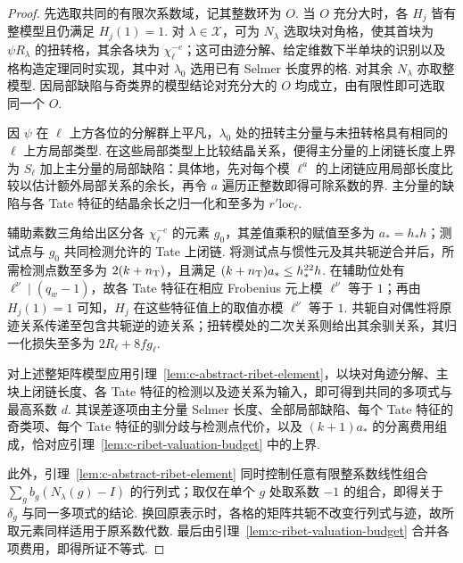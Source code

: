\begin{proof}
先选取共同的有限次系数域，记其整数环为 $O$.
当 $O$ 充分大时，各 $H_j$ 皆有整模型且仍满足 $H_j(1)=1$.
对 $\lambda\in\mathcal X$，可为 $N_\lambda$ 选取块对角格，使其首块为 $\psi R_\lambda$ 的扭转格，其余各块为 $\chi_\ell^{-e}$；这可由迹分解、给定维数下半单块的识别以及格构造定理同时实现，其中对 $\lambda_0$ 选用已有 Selmer 长度界的格.
对其余 $N_\lambda$ 亦取整模型. 因局部缺陷与奇类界的模型结论对充分大的 $O$ 均成立，由有限性即可选取同一个 $O$.

因 $\psi$ 在 $\ell$ 上方各位的分解群上平凡，$\lambda_0$ 处的扭转主分量与未扭转格具有相同的 $\ell$ 上方局部类型.
在这些局部类型上比较结晶关系，便得主分量的上闭链长度上界为 $S_\ell$ 加上主分量的局部缺陷：具体地，先对每个模 $\ell^a$ 的上闭链应用局部长度比较以估计额外局部关系的余长，再令 $a$ 遍历正整数即得可除系数的界.
主分量的缺陷与各 Tate 特征的结晶余长之归一化和至多为 $r'\mathrm{loc}_\ell$.

辅助素数三角给出区分各 $\chi_\ell^{-e}$ 的元素 $g_0$，其差值乘积的赋值至多为 $a_*=h_*h$；测试点与 $g_0$ 共同检测允许的 Tate 上闭链.
将测试点与惯性元及其共轭逆合并后，所需检测点数至多为 $2(k+n_{\rm T})$，且满足 $(k+n_{\rm T})a_*\le h_*^{22}h$.
在辅助位处有 $\ell^\nu\mid(q_w-1)$，故各 Tate 特征在相应 Frobenius 元上模 $\ell^\nu$ 等于 $1$；再由 $H_j(1)=1$ 可知，$H_j$ 在这些特征值上的取值亦模 $\ell^\nu$ 等于 $1$.
共轭自对偶性将原迹关系传递至包含共轭逆的迹关系；扭转模处的二次关系则给出其余驯关系，其归一化损失至多为 $2R_\ell+8f g_\ell$.

对上述整矩阵模型应用引理~\ref{lem:c-abstract-ribet-element}，以块对角迹分解、主块上闭链长度、各 Tate 特征的检测以及迹关系为输入，即可得到共同的多项式与最高系数 $d$.
其误差逐项由主分量 Selmer 长度、全部局部缺陷、每个 Tate 特征的奇类项、每个 Tate 特征的驯分歧与检测点代价，以及 $(k+1)a_*$ 的分离费用组成，恰对应引理~\ref{lem:c-ribet-valuation-budget} 中的上界.

此外，引理~\ref{lem:c-abstract-ribet-element} 同时控制任意有限整系数线性组合 $\sum_g b_g(N_\lambda(g)-I)$ 的行列式；取仅在单个 $g$ 处取系数 $-1$ 的组合，即得关于 $\delta_g$ 与同一多项式的结论.
换回原表示时，各格的矩阵共轭不改变行列式与迹，故所取元素同样适用于原系数代数.
最后由引理~\ref{lem:c-ribet-valuation-budget} 合并各项费用，即得所证不等式.
\end{proof}

